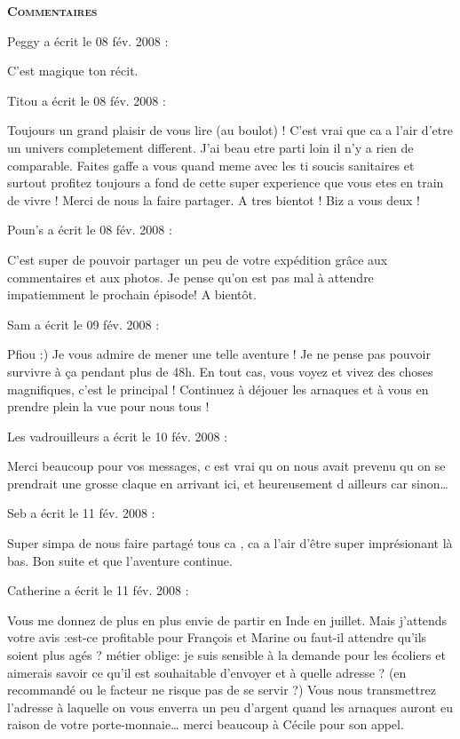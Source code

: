 \bigskip
\textbf{\textsc{Commentaires}}

\medskip
Peggy a écrit le 08 fév. 2008 :
\begin{displayquote}
C'est magique ton récit.
\end{displayquote}

\medskip
Titou a écrit le 08 fév. 2008 :
\begin{displayquote}
Toujours un grand plaisir de vous lire (au boulot) ! C'est vrai que ca a l'air d'etre un univers completement different. J'ai beau etre parti loin il n'y a rien de comparable. Faites gaffe a vous quand meme avec les ti soucis sanitaires et surtout profitez toujours a fond de cette super experience que vous etes en train de vivre ! Merci de nous la faire partager. A tres bientot ! Biz a vous deux !
\end{displayquote}

\medskip
Poun's a écrit le 08 fév. 2008 :
\begin{displayquote}
C'est super de pouvoir partager un peu de votre expédition grâce aux commentaires et aux photos. Je pense qu'on est pas mal à attendre impatiemment le prochain épisode!
A bientôt.
\end{displayquote}

\medskip
Sam a écrit le 09 fév. 2008 :
\begin{displayquote}
Pfiou :) Je vous admire de mener une telle aventure ! Je ne pense pas pouvoir survivre à ça pendant plus de 48h.
En tout cas, vous voyez et vivez des choses magnifiques, c'est le principal ! Continuez à déjouer les arnaques et à vous en prendre plein la vue pour nous tous !
\end{displayquote}

\medskip
Les vadrouilleurs a écrit le 10 fév. 2008 :
\begin{displayquote}
Merci beaucoup pour vos messages, c est vrai qu on nous avait prevenu qu on se prendrait une grosse claque en arrivant ici, et heureusement d ailleurs car sinon\dots
\end{displayquote}

\medskip
Seb a écrit le 11 fév. 2008 :
\begin{displayquote}
Super simpa de nous faire partagé tous ca , ca a l'air d'être super imprésionant là bas.
Bon suite et que l'aventure continue.
\end{displayquote}

\medskip
Catherine a écrit le 11 fév. 2008 :
\begin{displayquote}
Vous me donnez de plus en plus envie de partir en Inde en juillet. Mais j'attends votre avis :est-ce profitable pour François et Marine ou faut-il attendre qu'ils soient plus agés ?
        métier oblige: je suis sensible à la demande pour les écoliers et aimerais savoir ce qu'il est souhaitable d'envoyer et à quelle adresse ? (en recommandé ou le facteur ne risque pas de se servir ?)
        Vous nous transmettrez l'adresse à laquelle on vous enverra un peu d'argent quand les arnaques auront eu raison de votre porte-monnaie\dots
                merci beaucoup à Cécile pour son appel.
\end{displayquote}

